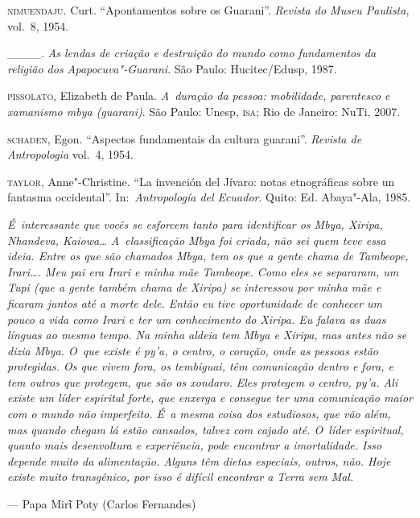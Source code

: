 \begin{Parskip}
\textsc{nimuendaju}. Curt. ``Apontamentos sobre os Guarani''. \emph{Revista do Museu
Paulista}, vol.~8, 1954.

\_\_\_\_. \emph{As lendas de criação e destruição do mundo como fundamentos da
religião dos Apapocuva"-Guarani}. São Paulo: Hucitec/Edusp, 1987.

\textsc{pissolato}, Elizabeth de Paula. \emph{A~duração da pessoa: mobilidade,
parentesco e xamanismo mbya (guarani)}. São Paulo: Unesp, \textsc{isa}; Rio de
Janeiro: NuTi, 2007.

\textsc{schaden}, Egon. ``Aspectos fundamentais da cultura guarani''. \emph{Revista de
Antropologia} vol.~4, 1954.

\textsc{taylor}, Anne"-Christine. ``La invención del Jívaro: notas etnográficas
sobre un fantasma occidental''. In:~\emph{Antropología del Ecuador}. Quito: Ed.
Abaya"-Ala, 1985.
\end{Parskip}

\clearpage

\vspace*{\fill}

\begin{flushright}
\begin{minipage}[c]{0.85\textwidth}
\raggedleft
\footnotesize
\emph{É~interessante que vocês se esforcem tanto para identificar os Mbya,
Xiripa, Nhandeva, Kaiowa\ldots{} A~classificação Mbya foi criada, não sei
quem teve essa ideia. Entre os que são chamados Mbya, tem os que a
gente chama de \emph{Tambeope, Irari\ldots{}}. Meu pai era Irari e
minha mãe Tambeope. Como eles se separaram, um Tupi (que a gente também
chama de Xiripa) se interessou por minha mãe e ficaram juntos até a
morte dele. Então eu tive oportunidade de conhecer um pouco a vida como
Irari e ter um conhecimento do Xiripa. Eu falava as duas línguas ao
mesmo tempo. Na minha aldeia tem Mbya e Xiripa, mas antes não se dizia
Mbya. O~que existe é \emph{py’a}, o centro, o coração, onde as pessoas estão
protegidas. Os que vivem fora, os \emph{tembiguai}, têm comunicação dentro e
fora, e tem outros que protegem, que são os \emph{xondaro}. Eles protegem o
centro, \emph{py’a}. Ali existe um líder espirital forte, que enxerga e
consegue ter uma comunicação maior com o mundo não imperfeito. É~a
mesma coisa dos estudiosos, que vão além, mas quando chegam lá
estão cansados, talvez com cajado até. O~líder espiritual, quanto mais
desenvoltura e experiência, pode encontrar a imortalidade. Isso depende
muito da alimentação. Alguns têm dietas especiais, outros, não. Hoje
existe muito transgênico, por isso é difícil encontrar a Terra sem Mal.}

\smallskip
\hspace*{\fill}--- Papa Mirῖ Poty (Carlos Fernandes)
\end{minipage}
\end{flushright}

